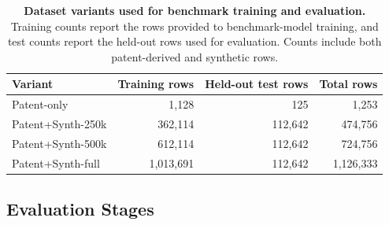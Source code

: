 \begin{table}[t]
\centering
\small
\caption{\textbf{Dataset variants used for benchmark training and evaluation.} Training counts report the rows provided to benchmark-model training, and test counts report the held-out rows used for evaluation. Counts include both patent-derived and synthetic rows.}
\label{tab:dataset_variants_splits}
\begin{tabular}{lrrr}
\toprule
\textbf{Variant} & \textbf{Training rows} & \textbf{Held-out test rows} & \textbf{Total rows} \\
\midrule
Patent-only & 1,128 & 125 & 1,253 \\
Patent+Synth-250k & 362,114 & 112,642 & 474,756 \\
Patent+Synth-500k & 612,114 & 112,642 & 724,756 \\
Patent+Synth-full & 1,013,691 & 112,642 & 1,126,333 \\
\bottomrule
\end{tabular}
\end{table}


\subsection{Evaluation Stages}


